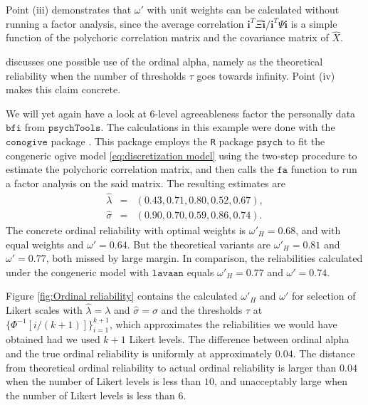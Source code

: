 \documentclass[twoside]{article}
\begin{document}
Point (iii) demonstrates that $\omega'$ with unit weights can be
calculated without running a factor analysis, since the average correlation
$\mathbf{i}^{T}\Xi\mathbf{i}/\mathbf{i}^{T}\Psi\mathbf{i}$ is a simple
function of the polychoric correlation matrix and the covariance matrix
of $\hat{X}.$ 

\citet[p. 1068]{Chalmers2018-fj} discusses one possible use of the
ordinal alpha, namely as the theoretical reliability when the number
of thresholds $\tau$ goes towards infinity. Point (iv) makes this
claim concrete.

\begin{example}
We will yet again have a look at $6$-level agreeableness factor the
personally data $\mathtt{bfi}$ from $\mathtt{psychTools}$. The calculations in this example were done with the $\mathtt{conogive}$ package \citep{conogive}. This package employs the \texttt{R} package $\mathtt{psych}$ \citep{psych} to fit the congeneric ogive
model \eqref{eq:discretization model} using the two-step procedure
to estimate the polychoric correlation matrix, and then calls the $\mathtt{fa}$ function to run a factor analysis on the said matrix.
The resulting estimates are 
\begin{eqnarray*}
\hat{\lambda} & = & (0.43,0.71,0.80,0.52,0.67),\\
\hat{\sigma} & = & (0.90,0.70,0.59,0.86,0.74).
\end{eqnarray*} The concrete ordinal reliability
with optimal weights is $\omega'_{H}=0.68$, and with equal weights
and $\omega'=0.64$. But the theoretical variants are $\omega'_{H}=0.81$
and $\omega'=0.77$, both missed by large margin. In comparison, the
reliabilities calculated under the congeneric model with $\mathtt{lavaan}$ \citep{Rosseel2012-yg}
equals $\omega'_{H}=0.77$ and $\omega'=0.74$.

Figure \ref{fig:Ordinal reliability} contains the calculated $\omega'_{H}$ and $\omega'$ for selection of Likert
scales with $\hat{\lambda} = \lambda$ and $\hat{\sigma}=\sigma$ and
the thresholds $\tau$ at $\{\Phi^{-1}[i/(k+1)]\}_{i=1}^{k+1}$, which
approximates the reliabilities we would have obtained had we used
$k+1$ Likert levels. The difference between ordinal alpha and the true ordinal reliability is uniformly at approximately $0.04$. The distance from theoretical ordinal reliability to actual ordinal reliability is larger than $0.04$ when the number of Likert levels is less than $10$, and unacceptably large when the number of Likert levels is less than $6$. 
\end{example}
\end{document}
